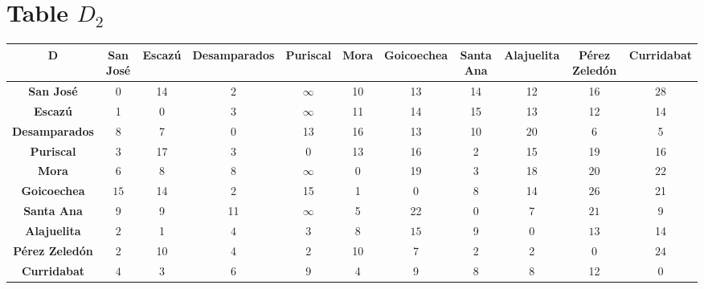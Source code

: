 \documentclass{article}
\begin{document}
\section{Table $D_{2}$}
\begin{center}
    \begin{tabular}{|c||c|c|c|c|c|c|c|c|c|c|}
        \hline
        \textbf{D} & \textbf{San José} & \textbf{Escazú} & \textbf{Desamparados} & \textbf{Puriscal} & \textbf{Mora} & \textbf{Goicoechea} & \textbf{Santa Ana} & \textbf{Alajuelita} & \textbf{Pérez Zeledón} & \textbf{Curridabat} \\
        \hline
        \hline
        \textbf{San José}& 0 & 14 & 2 & $\infty$ & 10 & 13 & 14 & 12 & 16 & \cellcolor[HTML]{D74894}$28$ \\
        \hline
        \textbf{Escazú}& 1 & 0 & 3 & $\infty$ & 11 & 14 & 15 & 13 & 12 & 14 \\
        \hline
        \textbf{Desamparados}& \cellcolor[HTML]{D74894}$8$ & 7 & 0 & 13 & 16 & 13 & 10 & \cellcolor[HTML]{D74894}$20$ & 6 & 5 \\
        \hline
        \textbf{Puriscal}& 3 & 17 & 3 & 0 & 13 & 16 & 2 & 15 & 19 & 16 \\
        \hline
        \textbf{Mora}& 6 & 8 & 8 & $\infty$ & 0 & 19 & 3 & 18 & \cellcolor[HTML]{D74894}$20$ & \cellcolor[HTML]{D74894}$22$ \\
        \hline
        \textbf{Goicoechea}& \cellcolor[HTML]{D74894}$15$ & 14 & 2 & 15 & 1 & 0 & 8 & 14 & \cellcolor[HTML]{D74894}$26$ & 21 \\
        \hline
        \textbf{Santa Ana}& 9 & 9 & 11 & $\infty$ & 5 & 22 & 0 & 7 & \cellcolor[HTML]{D74894}$21$ & 9 \\
        \hline
        \textbf{Alajuelita}& \cellcolor[HTML]{D74894}$2$ & 1 & \cellcolor[HTML]{D74894}$4$ & 3 & 8 & \cellcolor[HTML]{D74894}$15$ & 9 & 0 & \cellcolor[HTML]{D74894}$13$ & 14 \\
        \hline
        \textbf{Pérez Zeledón}& 2 & 10 & 4 & 2 & 10 & 7 & 2 & 2 & 0 & \cellcolor[HTML]{D74894}$24$ \\
        \hline
        \textbf{Curridabat}& \cellcolor[HTML]{D74894}$4$ & 3 & \cellcolor[HTML]{D74894}$6$ & 9 & 4 & 9 & 8 & 8 & 12 & 0 \\
        \hline
    \end{tabular}
\end{center}
\end{document}
